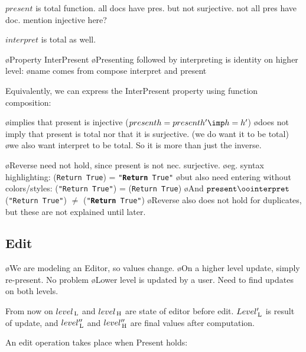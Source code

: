 
$present$ is total function. all docs have pres. but not surjective. not all pres have doc. mention injective here?

$interpret$ is total as well.


\bl
\o Property {\sc InterPresent} 
\o Presenting followed by interpreting is identity on higher level: 
\o name comes from compose interpret and present
\el


Equivalently, we can express the {\sc InterPresent} property using function composition: 


\bl
\o implies that present is injective ($present h = present h' \imp h = h'$)
\o does not imply that present is total nor that it is surjective. (we do want it to be total)
\o we also want interpret to be total. So it is more than just the inverse. 
\el

\bl
\o Reverse need not hold, since present is not nec. surjective.
\o eg. syntax highlighting: \present ({\tt Return True}) = {\tt "{\bf Return} True"}
\o but also need entering without colors/styles: \interpret ({\tt "Return True"}) = ({\tt Return True})
\o And $\present \oo \interpret$ ({\tt "Return True"}) $\neq$ ({\tt "{\bf Return} True"}) 
\o Reverse also does not hold for duplicates, but these are not explained until later.
\el

\subsection{Edit}

\bl
\o We are modeling an Editor, so values change.
\o On a higher level update, simply re-present. No problem
\o Lower level is updated by a user. Need to find updates on both levels.
\el


From now on $level_{\, \mathrm L}$ and $level_{\, \mathrm H}$ are state of editor before edit. $Level'_{\, \mathrm L}$ is result of update, and  $level''_{\, \mathrm L}$ and $level''_{\, \mathrm H}$ are final values after computation.

An edit operation takes place when {\sc Present} holds:



